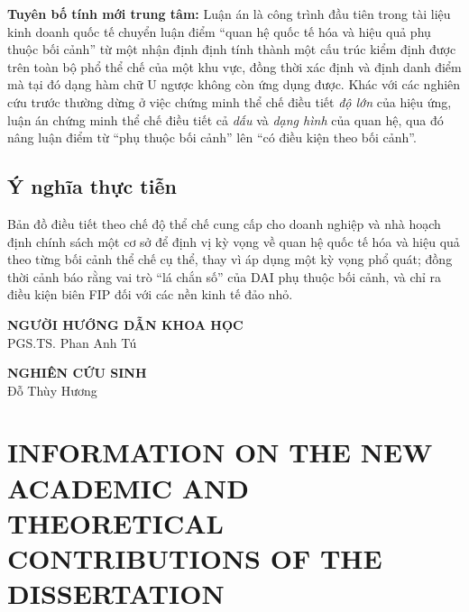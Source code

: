 \documentclass[
  a4paper,
  13pt]{extarticle}
\begin{document}
\textbf{Tuyên bố tính mới trung tâm:} Luận án là công trình đầu tiên
trong tài liệu kinh doanh quốc tế chuyển luận điểm ``quan hệ quốc tế hóa
và hiệu quả phụ thuộc bối cảnh'' từ một nhận định định tính thành một
cấu trúc kiểm định được trên toàn bộ phổ thể chế của một khu vực, đồng
thời xác định và định danh điểm mà tại đó dạng hàm chữ U ngược không còn
ứng dụng được. Khác với các nghiên cứu trước thường dừng ở việc chứng
minh thể chế điều tiết \emph{độ lớn} của hiệu ứng, luận án chứng minh
thể chế điều tiết cả \emph{dấu} và \emph{dạng hình} của quan hệ, qua đó
nâng luận điểm từ ``phụ thuộc bối cảnh'' lên ``có điều kiện theo bối
cảnh''.

\hypertarget{uxfd-nghux129a-thux1ef1c-tiux1ec5n}{%
\subsection*{Ý nghĩa thực
tiễn}\label{uxfd-nghux129a-thux1ef1c-tiux1ec5n}}

Bản đồ điều tiết theo chế độ thể chế cung cấp cho doanh nghiệp và nhà
hoạch định chính sách một cơ sở để định vị kỳ vọng về quan hệ quốc tế
hóa và hiệu quả theo từng bối cảnh thể chế cụ thể, thay vì áp dụng một
kỳ vọng phổ quát; đồng thời cảnh báo rằng vai trò ``lá chắn số'' của DAI
phụ thuộc bối cảnh, và chỉ ra điều kiện biên FIP đối với các nền kinh tế
đảo nhỏ.

\vspace{1.4cm}

\noindent\begin{minipage}[t]{0.48\textwidth}\centering \textbf{NGƯỜI HƯỚNG DẪN KHOA HỌC}\\[2.2cm]PGS.TS. Phan Anh Tú\end{minipage}\hfill\begin{minipage}[t]{0.48\textwidth}\centering \textbf{NGHIÊN CỨU SINH}\\[2.2cm]Đỗ Thùy Hương\end{minipage}

\newpage

\hypertarget{information-on-the-new-academic-and-theoretical-contributions-of-the-dissertation}{%
\section*{INFORMATION ON THE NEW ACADEMIC AND THEORETICAL CONTRIBUTIONS
OF THE
DISSERTATION}\label{information-on-the-new-academic-and-theoretical-contributions-of-the-dissertation}}
\end{document}

